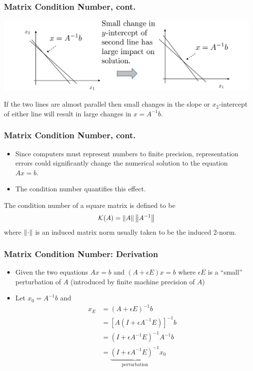 \documentclass{beamer}
\begin{document}
\begin{frame}\frametitle{Matrix Condition Number, cont.}
	\begin{center}
		\includegraphics[width=\textwidth]{figures/chap4_condition_number}
	\end{center}
	If the two lines are almost parallel then small changes in the slope or $x_2$-intercept of either line will result in large changes in $x = A^{-1}b$.
\end{frame}

\begin{frame}\frametitle{Matrix Condition Number, cont.}
	\begin{itemize}
		\item Since computers must represent numbers to finite precision, representation errors could significantly change the numerical solution to the equation $Ax = b$.
		\item The condition number quantifies this effect.
	\end{itemize}
	
	\begin{definition}
		The condition number of a square matrix is defined to be
		\[ \mathcal{K}(A) = \left\|A \right\|\left\|A^{-1} \right\| \]
		where $\left\|\cdot \right\|$ is an induced matrix norm usually taken to be the induced 2-norm.
	\end{definition}
\end{frame}

\begin{frame}\frametitle{Matrix Condition Number: Derivation}
	\begin{itemize}
		\item Given the two equations $Ax = b$ and $(A + \epsilon E)x = b$ where $\epsilon E$ is a ``small'' perturbation of $A$ (introduced by finite machine precision of $A$)
		\item Let $x_0 = A^{-1}b$ and
			\begin{align*}
				x_E &= (A + \epsilon E)^{-1}b\\
				&= [A(I + \epsilon A^{-1}E)]^{-1}b\\
				&= (I+\epsilon A^{-1}E)^{-1}A^{-1}b \\
				&= \underbrace{(I+\epsilon A^{-1}E)^{-1}}_{\text{perturbation}}x_0
			\end{align*}
	\end{itemize}
\end{frame}
\end{document}
